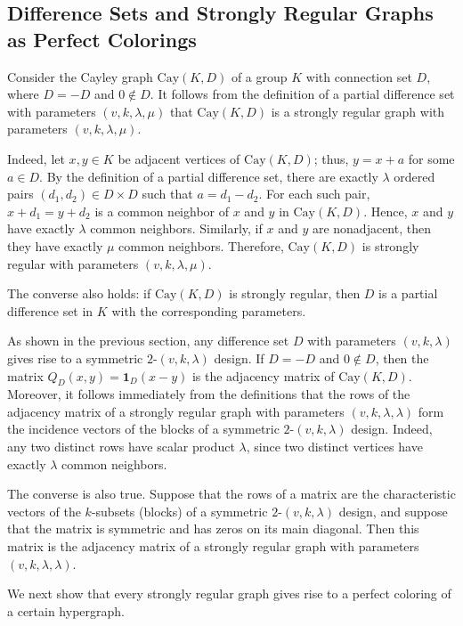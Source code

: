\documentclass[11pt]{article}
\theoremstyle{definition}
\begin{document}
{{{\subsection{Difference Sets and Strongly Regular Graphs as Perfect Colorings}\label{17.5}




Consider the Cayley graph $\mathrm{Cay}(K,D)$ of a group $K$ with connection set $D$, where $D=-D$ and $0\notin D$. It follows from the definition of a partial difference set with parameters $(v,k,\lambda,\mu)$ that $\mathrm{Cay}(K,D)$ is a strongly regular graph with parameters $(v,k,\lambda,\mu)$.

Indeed, let $x,y\in K$ be adjacent vertices of $\mathrm{Cay}(K,D)$; thus, $y=x+a$ for some $a\in D$. By the definition of a partial difference set, there are exactly $\lambda$ ordered pairs $(d_1,d_2)\in D\times D$ such that
$a=d_1-d_2$.
For each such pair,
$x+d_1=y+d_2$
is a common neighbor of $x$ and $y$ in $\mathrm{Cay}(K,D)$. Hence, $x$ and $y$ have exactly $\lambda$ common neighbors. Similarly, if $x$ and $y$ are nonadjacent, then they have exactly $\mu$ common neighbors. Therefore, $\mathrm{Cay}(K,D)$ is strongly regular with parameters $(v,k,\lambda,\mu)$.

The converse also holds: if $\mathrm{Cay}(K,D)$ is strongly regular, then $D$ is a partial difference set in $K$ with the corresponding parameters.

As shown in the previous section, any difference set $D$ with parameters $(v,k,\lambda)$ gives rise to a symmetric $2$-$(v,k,\lambda)$ design. If $D=-D$ and $0\notin D$, then the matrix
$Q_{D}(x,y)={\mathbf 1}_D(x-y)
$
is the adjacency matrix of $\mathrm{Cay}(K,D)$. Moreover, it follows immediately from the definitions that the rows of the adjacency matrix of a strongly regular graph with parameters $(v,k,\lambda,\lambda)$ form the incidence vectors of the blocks of a symmetric $2$-$(v,k,\lambda)$ design. Indeed, any two distinct rows have scalar product $\lambda$, since two distinct vertices have exactly $\lambda$ common neighbors.

The converse is also true. Suppose that the rows of a matrix are the characteristic vectors of the $k$-subsets (blocks) of a symmetric $2$-$(v,k,\lambda)$ design, and suppose that the matrix is symmetric and has zeros on its main diagonal. Then this matrix is the adjacency matrix of a strongly regular graph with parameters $(v,k,\lambda,\lambda)$.




We next show that every strongly regular graph gives rise to a perfect coloring of a certain hypergraph.

}}}
\end{document}
